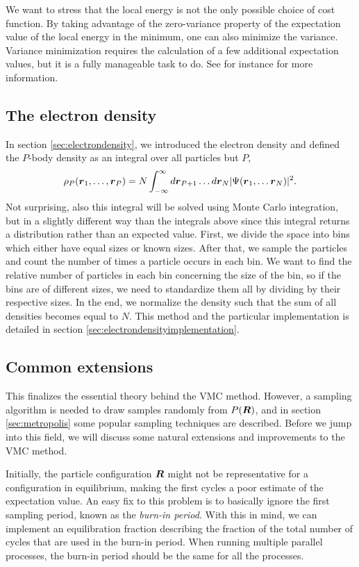 We want to stress that the local energy is not the only possible choice of cost function. By taking advantage of the zero-variance property of the expectation value of the local energy in the minimum, one can also minimize the variance. Variance minimization requires the calculation of a few additional expectation values, but it is a fully manageable task to do. See for instance \citet{bajdich_electronic_2010} for more information.

\subsection{The electron density} \label{sec:electrondensityqmc}
In section \ref{sec:electrondensity}, we introduced the electron density and defined the $P$-body density as an integral over all particles but $P$,
\begin{equation}
\rho_P(\boldsymbol{{r}}_1,\hdots,\boldsymbol{{r}}_P)=N\int_{-\infty}^{\infty}d\boldsymbol{{r}}_{P+1}\hdots d\boldsymbol{{r}}_N |\Psi(\boldsymbol{{r}}_1,\hdots \boldsymbol{{r}}_N)|^2.
\end{equation}
Not surprising, also this integral will be solved using Monte Carlo integration, but in a slightly different way than the integrals above since this integral returns a distribution rather than an expected value. First, we divide the space into bins which either have equal sizes or known sizes. After that, we sample the particles and count the number of times a particle occurs in each bin. We want to find the relative number of particles in each bin concerning the size of the bin, so if the bins are of different sizes, we need to standardize them all by dividing by their respective sizes. In the end, we normalize the density such that the sum of all densities becomes equal to $N$. This method and the particular implementation is detailed in section \ref{sec:electrondensityimplementation}.

\subsection{Common extensions}
This finalizes the essential theory behind the VMC method. However, a sampling algorithm is needed to draw samples randomly from $P(\boldsymbol{{R}})$, and in section \ref{sec:metropolis} some popular sampling techniques are described. Before we jump into this field, we will discuss some natural extensions and improvements to the VMC method.

Initially, the particle configuration $\boldsymbol{{R}}$ might not be representative for a configuration in equilibrium, making the first cycles a poor estimate of the expectation value. An easy fix to this problem is to basically ignore the first sampling period, known as the \textit{burn-in period}. With this in mind, we can implement an equilibration fraction describing the fraction of the total number of cycles that are used in the burn-in period. When running multiple parallel processes, the burn-in period should be the same for all the processes.

